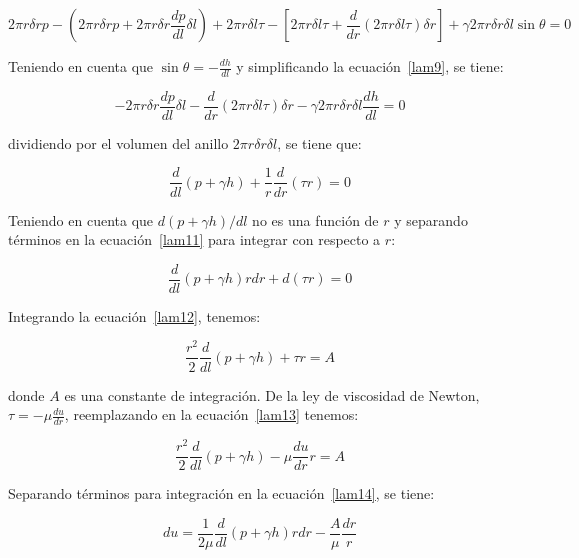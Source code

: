 \documentclass[11pt, oneside]{article}
\begin{document}
\begin{equation}
2\pi r \delta r p -\left( 2\pi r \delta r p + 2\pi r \delta r \frac{dp}{dl} \delta l \right ) + 2\pi r \delta l \tau - \left[ 2\pi r \delta l \tau + \frac{d}{dr}(2\pi r \delta l \tau) \delta r \right] + \gamma 2 \pi r \delta r \delta l \sin \theta = 0  
\label{lam9}
\end{equation}

Teniendo en cuenta que $\sin \theta = -\frac{dh}{dl}$ y simplificando  la ecuaci\'on~\ref{lam9}, se tiene:

\begin{equation}
- 2\pi r \delta r \frac{dp}{dl} \delta l  - \frac{d}{dr}(2\pi r \delta l \tau) \delta r  - \gamma 2 \pi r \delta r \delta l \frac{dh}{dl} = 0  
\label{lam10}
\end{equation}

dividiendo por el volumen del anillo $2\pi r\delta r \delta l$, se tiene que:

\begin{equation}
\frac{d}{dl}(p + \gamma h) + \frac{1}{r}\frac{d}{dr}(\tau r) = 0
\label{lam11}
\end{equation}

Teniendo en cuenta que $d(p + \gamma h)/dl$ no es una funci\'on de $r$ y separando t\'erminos en la ecuaci\'on~\ref{lam11} para integrar con respecto a $r$:

\begin{equation}
\frac{d}{dl}(p + \gamma h) r dr + d(\tau r ) = 0
\label{lam12}
\end{equation}

Integrando la ecuaci\'on~\ref{lam12}, tenemos:
 
\begin{equation}
\frac{r^2}{2}\frac{d}{dl}(p + \gamma h) + \tau r = A
\label{lam13}
\end{equation}

donde $A$ es una constante de integraci\'on. De la ley de viscosidad de Newton, $\tau = - \mu \frac{du}{dr}$, reemplazando en la ecuaci\'on~\ref{lam13} tenemos:

\begin{equation}
\frac{r^2}{2}\frac{d}{dl}(p + \gamma h) -\mu \frac{du}{dr} r = A
\label{lam14}
\end{equation}

Separando t\'erminos para integraci\'on en la ecuaci\'on~\ref{lam14}, se tiene:

\begin{equation}
du = \frac{1}{2\mu} \frac{d}{dl}(p + \gamma h) r dr -\frac{A}{\mu}\frac{dr}{r}
\label{lam15}
\end{equation}
 
\end{document}
